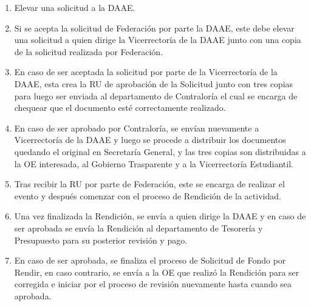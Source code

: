\begin{enumerate}
    \item Elevar una solicitud a la DAAE. 
    \item Si se acepta la solicitud de Federación por parte la DAAE, este debe elevar una solicitud a quien dirige la Vicerrectoría de la DAAE junto con una copia de la solicitud realizada por Federación. 
    \item En caso de ser aceptada la solicitud por parte de la Vicerrectoría de la DAAE, esta crea la RU de aprobación de la Solicitud junto con tres copias para luego ser enviada al departamento de Contraloría el cual se encarga de chequear que el documento esté correctamente realizado. 
    \item En caso de ser aprobado por Contraloría, se envían nuevamente a Vicerrectoría de la DAAE y luego se procede a distribuir los documentos quedando el original en Secretaría General, y las tres copias son distribuidas a la OE interesada, al Gobierno Trasparente y a la Vicerrectoría Estudiantil.
    \item Tras recibir la RU por parte de Federación, este se encarga de realizar el evento y después comenzar con el proceso de Rendición de la actividad. 
    \item Una vez finalizada la Rendición, se envía a quien dirige la DAAE y en caso de ser aprobada se envía la Rendición al departamento de Tesorería y Presupuesto para su posterior revisión y pago.
    \item En caso de ser aprobada, se finaliza el proceso de Solicitud de Fondo por Rendir, en caso contrario, se envía a la OE que realizó la Rendición para ser corregida e iniciar por el proceso de revisión nuevamente hasta cuando sea aprobada.
\end{enumerate}

